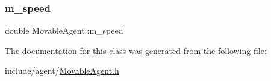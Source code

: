 \subsubsection{\texorpdfstring{m\+\_\+speed}{m\_speed}}
{\footnotesize\ttfamily double Movable\+Agent\+::m\+\_\+speed\hspace{0.3cm}{\ttfamily [private]}}



The documentation for this class was generated from the following file\+:\begin{DoxyCompactItemize}
\item 
include/agent/\hyperlink{_movable_agent_8h}{Movable\+Agent.\+h}\end{DoxyCompactItemize}
